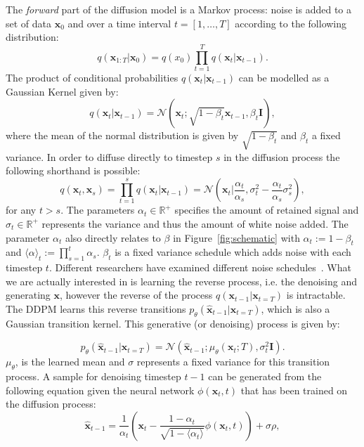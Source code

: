 \documentclass[journal=jacsat,manuscript=article]{achemso}
\begin{document}
The \textit{forward} part of the diffusion model is a Markov process: noise is added to a set of data $\mathbf{x}_0$ and over a time interval $t = [1,\ldots,T]$ according to the following distribution:
\begin{equation}
  q(\mathbf{x}_{1:T}|\mathbf{x}_0) = q(x_0)\prod_{t=1}^T q(\mathbf{x}_t|\mathbf{x}_{t-1}).
  \label{eqn:noising}
\end{equation}
The product of conditional probabilities $q(\mathbf{x}_t | \mathbf{x}_{t-1})$ can be modelled as a Gaussian Kernel given by:
\begin{equation}
q(\mathbf{x}_t | \mathbf{x}_{t-1}) = \mathcal{N}(\mathbf{x}_t;\sqrt{1-\beta_t}\mathbf{x}_{t-1}, \beta_t\mathbf{I}),
\end{equation}
where the mean of the normal distribution is given by $ \sqrt{1-\beta_t}$ and $\beta_t$ a fixed variance. 
In order to diffuse directly to timestep $s$ in the diffusion process the following shorthand is possible:
\begin{equation}
    q(\mathbf{x}_t, \mathbf{x}_s)=\prod_{t=1}^s q(\mathbf{x}_t|\mathbf{x}_{t-1})=\mathcal{N}(\mathbf{x}_t|\frac{\alpha_t}{\alpha_s}, \sigma_t^2-\frac{\alpha_t}{\alpha_s}\sigma^2_s),
\end{equation}
for any $t>s$. The parameters $\alpha_t \in \mathbb{R}^{+}$ specifies the amount of retained signal and $\sigma_t \in \mathbb{R}^{+}$ represents the variance and thus the amount of white noise added. The parameter $\alpha_t$ also directly relates to $\beta$ in Figure~\ref{fig:schematic} with $\alpha_t:=1-\beta_t$ and $\langle\alpha\rangle_t:=\prod_{s=1}^t\alpha_s$. $\beta_t$ is a fixed variance schedule which adds noise with each timestep $t$.
Different researchers have examined different noise schedules~\cite{sohl-dickstein2015deep, ho2020denoising}.
What we are actually interested in is learning the reverse process, i.e. the denoising and generating $\mathbf{x}$, however the reverse of the process $q(\mathbf{x}_{t-1}|\mathbf{x}_{t=T})$ is intractable. The DDPM learns this reverse transitions $p_{\theta}(\hat{\mathbf{x}}_{t-1}|\mathbf{x}_{t=T})$, which is also a Gaussian transition kernel. This generative (or denoising) process is given by:

\begin{equation}
p_{\theta}(\hat{\mathbf{x}}_{t-1}|\mathbf{x}_{t=T})=\mathcal{N}(\hat{\mathbf{x}}_{t-1}; \mu_{\theta}(\mathbf{x}_t;T), \sigma_t^2\mathbf{I}).
\label{eqn:denoising}
\end{equation}
$\mu_{\theta}$, is the learned mean and $\sigma$ represents a fixed variance for this transition process.
A sample for denoising timestep $t-1$ can be generated from the following equation given the neural network $\phi(\mathbf{x}_t,t)$ that has been trained on the diffusion process: 
\begin{equation}
 \hat{\mathbf{x}}_{t-1} = \frac{1}{\alpha_t}(\mathbf{x}_t-\frac{1-\alpha_t}{\sqrt{1-\langle\alpha_t\rangle}}\phi(\mathbf{x}_t,t)) +\sigma \rho,   
\end{equation}
\end{document}
